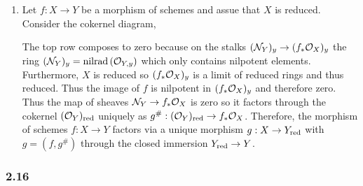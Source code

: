 \documentclass[12pt]{article}
\begin{document}
\begin{enumerate}
\item Let $f : X \to Y$ be a morphism of schemes and assue that $X$ is reduced. Consider the cokernel diagram,
\begin{center}
\end{center}
The top row composes to zero because on the stalks $(\mathcal{N}_Y)_y \to (f_* \mathcal{O}_{X})_y$ the ring $(\mathcal{N}_Y)_y = \mathrm{nilrad}\left( \mathcal{O}_{Y, y} \right)$ which only contains nilpotent elements. Furthermore, $X$ is reduced so $(f_* \mathcal{O}_{X})_y$ is a limit of reduced rings and thus reduced. Thus the image of $f$ is nilpotent in $(f_* \mathcal{O}_{X})_y$ and therefore zero. Thus the map of sheaves $\mathcal{N}_Y \to f_* \mathcal{O}_{X}$ is zero so it factors through the cokernel $(\mathcal{O}_{Y})_{\mathrm{red}}$ uniquely as $g^\# : (\mathcal{O}_{Y})_{\mathrm{red}} \to f_* \mathcal{O}_{X}$. Therefore, the morphism of schemes $f : X \to Y$ factors via a unique morphism $g : X \to Y_{\mathrm{red}}$ with $g = (f, g^\#)$ through the closed immersion $Y_{\mathrm{red}} \to Y$.
\end{enumerate}

\subsubsection{2.16}
\end{document}
